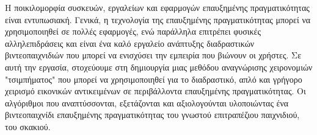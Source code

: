 Η ποικιλομορφία συσκευών, εργαλείων και εφαρμογών επαυξημένης πραγματικότητας είναι εντυπωσιακή. Γενικά, η τεχνολογία της επαυξημένης πραγματικότητας μπορεί να χρησιμοποιηθεί σε πολλές εφαρμογές, ενώ παράλληλα επιτρέπει φυσικές αλληλεπιδράσεις και είναι ένα καλό εργαλείο ανάπτυξης διαδραστικών βιντεοπαιχνιδιών που μπορεί να ενισχύσει την εμπειρία που βιώνουν οι χρήστες. Σε αυτή την εργασία, στοχεύουμε στη δημιουργία μιας μεθόδου αναγνώρισης χειρονομιών "τσιμπήματος" που μπορεί να χρησιμοποιηθεί για το διαδραστικό, απλό και γρήγορο χειρισμό εικονικών αντικειμένων σε περιβάλλοντα επαυξημένης πραγματικότητας. Οι αλγόριθμοι που αναπτύσσονται, εξετάζονται και αξιολογούνται υλοποιώντας ένα βιντεοπαιχνίδι επαυξημένης πραγματικότητας του γνωστού επιτραπέζιου παιχνιδιού, του σκακιού.
